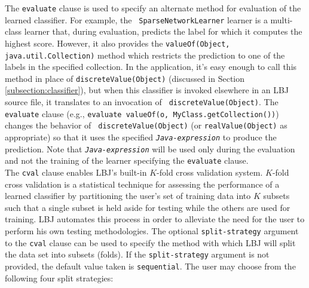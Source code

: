The {\tt evaluate} clause is used to specify an alternate method for
evaluation of the learned classifier.  For example, the {\tt
SparseNetworkLearner} learner is a multi-class learner that, during
evaluation, predicts the label for which it computes the highest score.
However, it also provides the {\tt valueOf(Object, java.util.Collection)}
method which restricts the prediction to one of the labels in the specified
collection.  In the application, it's easy enough to call this method in place
of {\tt discreteValue(Object)} (discussed in Section
\ref{subsection:classifier}), but when this classifier is invoked elsewhere in
an LBJ source file, it translates to an invocation of {\tt
discreteValue(Object)}.  The {\tt evaluate} clause (e.g., {\tt evaluate
valueOf(o, MyClass.getCollection())}) changes the behavior of {\tt
discreteValue(Object)} (or {\tt realValue(Object)} as appropriate) so that it
uses the specified {\tt\emph{Java-expression}} to produce the prediction.
Note that {\tt\emph{Java-expression}} will be used only during the evaluation
and not the training of the learner specifying the {\tt evaluate} clause. \\

The {\tt cval} clause enables LBJ's built-in $K$-fold cross validation system.
$K$-fold cross validation is a statistical technique for assessing the
performance of a learned classifier by partitioning the user's set of training
data into $K$ subsets such that a single subset is held aside for testing
while the others are used for training. LBJ automates this process in order to
alleviate the need for the user to perform his own testing methodologies. The
optional {\tt split-strategy} argument to the {\tt cval} clause can be used to
specify the method with which LBJ will split the data set into subsets
(folds). If the {\tt split-strategy} argument is not provided, the default
value taken is {\tt sequential}. The user may choose from the following four
split strategies:

